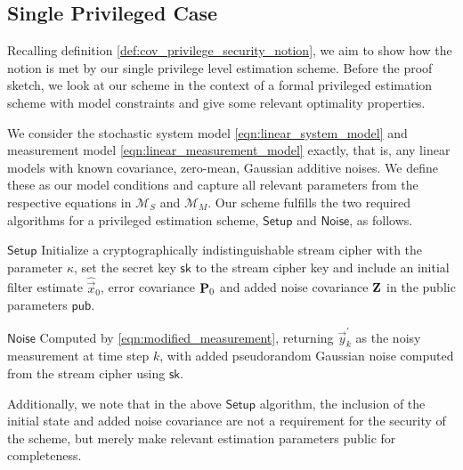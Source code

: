 \documentclass[letterpaper, 10 pt, conference]{ieeeconf}
\begin{document}
\subsection{Single Privileged Case}
Recalling definition \ref{def:cov_privilege_security_notion}, we aim to show how the notion is met by our single privilege level estimation scheme. Before the proof sketch, we look at our scheme in the context of a formal privileged estimation scheme with model constraints and give some relevant optimality properties.

We consider the stochastic system model \eqref{eqn:linear_system_model} and measurement model \eqref{eqn:linear_measurement_model} exactly, that is, any linear models with known covariance, zero-mean, Gaussian additive noises. We define these as our model conditions and capture all relevant parameters from the respective equations in $\mathcal{M}_S$ and $\mathcal{M}_M$. Our scheme fulfills the two required algorithms for a privileged estimation scheme, $\mathsf{Setup}$ and $\mathsf{Noise}$, as follows.
\begin{LaTeXdescription}
   \item[$\mathsf{Setup}$] Initialize a cryptographically indistinguishable stream cipher with the parameter $\kappa$, set the secret key $\mathsf{sk}$ to the stream cipher key and include an initial filter estimate $\hat{\vec{x}}_0$, error covariance ${{\mathbf{P}}}_0$ and added noise covariance ${{\mathbf{Z}}}$ in the public parameters $\mathsf{pub}$.
   \item[$\mathsf{Noise}$] Computed by \eqref{eqn:modified_measurement}, returning $\vec{y}^\prime_k$ as the noisy measurement at time step $k$, with added pseudorandom Gaussian noise computed from the stream cipher using $\mathsf{sk}$.
\end{LaTeXdescription}
Additionally, we note that in the above $\mathsf{Setup}$ algorithm, the inclusion of the initial state and added noise covariance are not a requirement for the security of the scheme, but merely make relevant estimation parameters public for completeness.
\end{document}
